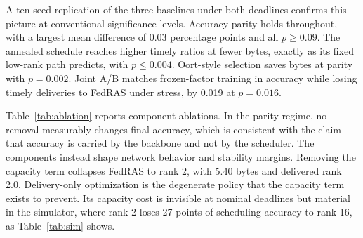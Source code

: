 \documentclass[preprint,12pt]{elsarticle}
\begin{document}
A ten-seed replication of the three baselines under both deadlines confirms this picture at conventional significance levels. Accuracy parity holds throughout, with a largest mean difference of 0.03 percentage points and all $p\ge0.09$. The annealed schedule reaches higher timely ratios at fewer bytes, exactly as its fixed low-rank path predicts, with $p\le0.004$. Oort-style selection saves bytes at parity with $p=0.002$. Joint A/B matches frozen-factor training in accuracy while losing timely deliveries to FedRAS under stress, by 0.019 at $p=0.016$.

\begin{table}[H]
\centering
\caption{Component ablations, real trainer (non-IID CIFAR-10, five seeds, nominal deadline). The Min. column is the minimum per-seed-mean accuracy over rounds, reported for the elevated-learning-rate stability check at lr $0.02$.}
\label{tab:ablation}
\end{table}

Table~\ref{tab:ablation} reports component ablations. In the parity regime, no removal measurably changes final accuracy, which is consistent with the claim that accuracy is carried by the backbone and not by the scheduler. The components instead shape network behavior and stability margins. Removing the capacity term collapses FedRAS to rank 2, with 5.40 bytes and delivered rank 2.0. Delivery-only optimization is the degenerate policy that the capacity term exists to prevent. Its capacity cost is invisible at nominal deadlines but material in the simulator, where rank 2 loses 27 points of scheduling accuracy to rank 16, as Table~\ref{tab:sim} shows.
\end{document}
